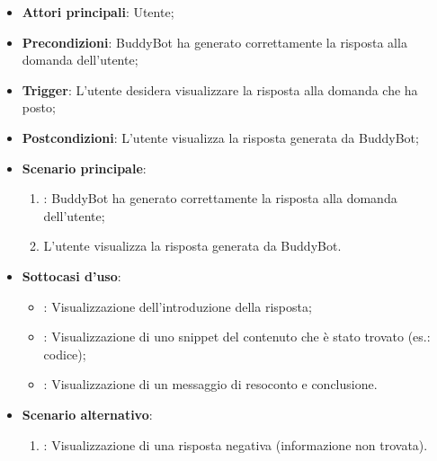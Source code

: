 \begin{itemize}
    \item \textbf{Attori principali}: Utente;
    \item \textbf{Precondizioni}: BuddyBot ha generato correttamente la risposta alla domanda dell'utente;
    \item \textbf{Trigger}: L'utente desidera visualizzare la risposta alla domanda che ha posto;
    \item \textbf{Postcondizioni}: L'utente visualizza la risposta generata da BuddyBot;
    \item \textbf{Scenario principale}:
    \begin{enumerate}
        \item {}: BuddyBot ha generato correttamente la risposta alla domanda dell'utente;
        \item L'utente visualizza la risposta generata da BuddyBot.
    \end{enumerate}
    \item \textbf{Sottocasi d'uso}:
    \begin{itemize}
        \item {}: Visualizzazione dell'introduzione della risposta;
        \item {}: Visualizzazione di uno snippet del contenuto che è stato trovato (es.: codice);
        \item {}: Visualizzazione di un messaggio di resoconto e conclusione.
    \end{itemize}
    \item \textbf{Scenario alternativo}:
    \begin{enumerate}
        \item {}: Visualizzazione di una risposta negativa (informazione non trovata).
    \end{enumerate}
\end{itemize}



\hypertarget{UC5.1}{}

